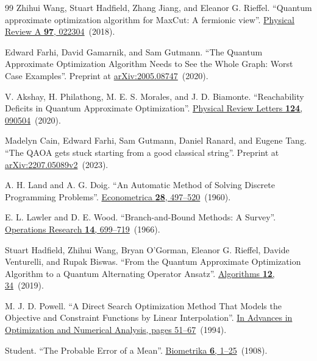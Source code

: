 \documentclass[a4paper,onecolumn,11pt,unpublished]{quantumarticle}
\theoremstyle{remark}
\begin{document}
\begin{thebibliography}{99}
Zhihui Wang, Stuart Hadfield, Zhang Jiang, and Eleanor G. Rieffel.
\newblock ``Quantum approximate optimization algorithm for MaxCut: A fermionic view''.
\newblock \href{https://doi.org/10.1103/physreva.97.022304}{Physical Review A {\bf 97}, 022304}~(2018).


Edward Farhi, David Gamarnik, and Sam Gutmann.
\newblock ``The Quantum Approximate Optimization Algorithm Needs to See the Whole Graph: Worst Case Examples''.
\newblock Preprint at \href{https://arxiv.org/abs/2005.08747}{arXiv:2005.08747}~(2020).


V. Akshay, H. Philathong, M. E. S. Morales, and J. D. Biamonte.
\newblock ``Reachability Deficits in Quantum Approximate Optimization''.
\newblock \href{https://doi.org/10.1103/physrevlett.124.090504}{Physical Review Letters {\bf 124}, 090504}~(2020).


Madelyn Cain, Edward Farhi, Sam Gutmann, Daniel Ranard, and Eugene Tang.
\newblock ``The QAOA gets stuck starting from a good classical string''.
\newblock Preprint at \href{https://arxiv.org/abs/2207.05089v2}{arXiv:2207.05089v2}~(2023).


A. H. Land and A. G. Doig.
\newblock ``An Automatic Method of Solving Discrete Programming Problems''.
\newblock \href{https://doi.org/10.2307/1910129}{Econometrica {\bf 28}, 497--520}~(1960).


E. L. Lawler and D. E. Wood.
\newblock ``Branch-and-Bound Methods: A Survey''.
\newblock \href{https://doi.org/10.1287/opre.14.4.699}{Operations Research {\bf 14}, 699--719}~(1966).


Stuart Hadfield, Zhihui Wang, Bryan O'Gorman, Eleanor G. Rieffel, Davide Venturelli, and Rupak Biswas.
\newblock ``From the Quantum Approximate Optimization Algorithm to a Quantum Alternating Operator Ansatz''.
\newblock \href{https://doi.org/10.3390/a12020034}{Algorithms {\bf 12}, 34}~(2019).


M. J. D. Powell.
\newblock ``A Direct Search Optimization Method That Models the Objective and Constraint Functions by Linear Interpolation''.
\newblock \href{https://doi.org/10.1007/978-94-015-8330-5_4}{In Advances in Optimization and Numerical Analysis, pages 51--67}~(1994).


Student.
\newblock ``The Probable Error of a Mean''.
\newblock \href{https://doi.org/10.2307/2331554}{Biometrika {\bf 6}, 1--25}~(1908).



\end{thebibliography}
\end{document}
